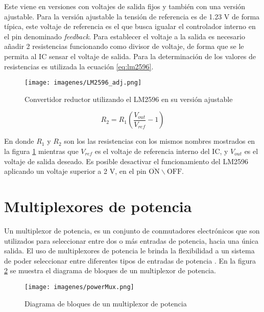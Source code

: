  Este viene en versiones con voltajes de 
 salida fijos y también con una versión ajustable.  Para la versión ajustable la tensión de
 referencia es de 1.23 V de forma típica, este voltaje de referencia es el que busca igualar
 el controlador interno en el pin denominado \textit{feedback}. Para establecer el voltaje
 a la salida es necesario añadir 2 resistencias funcionando como divisor de voltaje, 
 de forma que se le permita al IC sensar el voltaje de salida. Para la determinación de los
valores de resistencias es utilizada la ecuación \ref{eq:lm2596}. 

 \begin{figure}[H]
    \centering
    \texttt{[image: imagenes/LM2596\_adj.png]}
    \caption{Convertidor reductor utilizando el LM2596 en su versión ajustable \cite{lm2596}}
    \label{fig:lm2596}
 \end{figure}
 
\begin{equation}
    R_2 = R_1(\frac{V_{out}}{V_{ref}} - 1)
    \label{eq:lm2596}
\end{equation}

En donde $R_1$ y $R_2$ son los las resistencias con los mismos nombres mostrados en la
figura \ref{fig:lm2596} mientras que $V_{ref}$ es el voltaje de referencia interno del
IC, y $V_{out}$ es el voltaje de salida deseado. Es posible desactivar el funcionamiento
del LM2596 aplicando un voltaje superior a 2 V, en el pin 
$\overline{\text{ON}}\backslash\text{OFF}$.


\section{Multiplexores de potencia}

Un multiplexor de potencia, es un conjunto de conmutadores electrónicos que son utilizados
para seleccionar entre dos o más entradas de potencia, hacia una única salida. El uso de 
multiplexores de potencia le brinda la flexibilidad a un sistema de poder seleccionar
entre diferentes tipos de entradas de potencia \cite{triano_basics_2020}. En la figura 
\ref{fig:powerMux} se muestra el diagrama de bloques de un multiplexor de potencia.


\begin{figure}[H]
    \centering
    \texttt{[image: imagenes/powerMux.png]}
    \caption{Diagrama de bloques de un multiplexor de potencia \cite{triano_basics_2020}}
    \label{fig:powerMux}
\end{figure}


